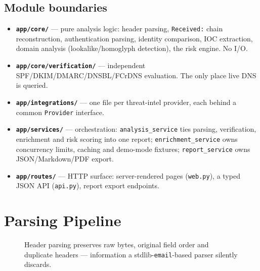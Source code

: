 \documentclass[11pt,a4paper]{article}
\begin{document}
\subsection{Module boundaries}
\begin{itemize}[leftmargin=1.4em]
  \item \textbf{\texttt{app/core/}} — pure analysis logic: header parsing, \texttt{Received:}
    chain reconstruction, authentication parsing, identity comparison, IOC extraction, domain
    analysis (lookalike/homoglyph detection), the risk engine. No I/O.
  \item \textbf{\texttt{app/core/verification/}} — independent SPF/DKIM/DMARC/DNSBL/FCrDNS
    evaluation. The only place live DNS is queried.
  \item \textbf{\texttt{app/integrations/}} — one file per threat-intel provider, each behind
    a common \texttt{Provider} interface.
  \item \textbf{\texttt{app/services/}} — orchestration: \texttt{analysis\_service} ties
    parsing, verification, enrichment and risk scoring into one report;
    \texttt{enrichment\_service} owns concurrency limits, caching and demo-mode fixtures;
    \texttt{report\_service} owns JSON/Markdown/PDF export.
  \item \textbf{\texttt{app/routes/}} — HTTP surface: server-rendered pages (\texttt{web.py}),
    a typed JSON API (\texttt{api.py}), report export endpoints.
\end{itemize}

\section{Parsing Pipeline}

\begin{figure}[h]
\centering
{}
\caption{Header parsing preserves raw bytes, original field order and duplicate headers —
information a stdlib-\texttt{email}-based parser silently discards.}
\end{figure}
\end{document}
